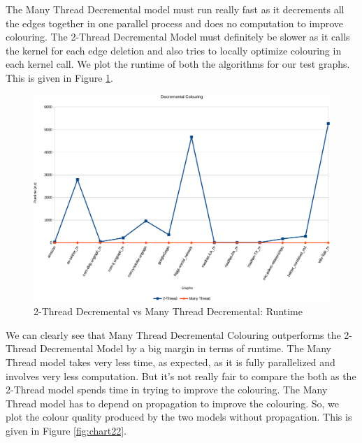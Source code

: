 \documentclass[MTech]{iitmdiss}
\begin{document}
The Many Thread Decremental model must run really fast as it decrements all the edges together in one parallel process and does no computation to improve colouring. The 2-Thread Decremental Model must definitely be slower as it calls the kernel for each edge deletion and also tries to locally optimize colouring in each kernel call. We plot the runtime of both the algorithms for our test graphs. This is given in Figure \ref{fig:chart21}. 

\begin{figure}[h]
    \centering
    \includegraphics[width=\textwidth,keepaspectratio=true]{chartNewest16.pdf}
    \caption{
        2-Thread Decremental vs Many Thread Decremental: Runtime
    }
    \label{fig:chart21}
\end{figure}

We can clearly see that Many Thread Decremental Colouring outperforms the 2-Thread Decremental Model by a big margin in terms of runtime. The Many Thread model takes very less time, as expected, as it is fully parallelized and involves very less computation. But it's not really fair to compare the both as the 2-Thread model spends time in trying to improve the colouring. The Many Thread model has to depend on propagation to improve the colouring. So, we plot the colour quality produced by the two models without propagation. This is given in Figure \ref{fig:chart22}.
\end{document}
